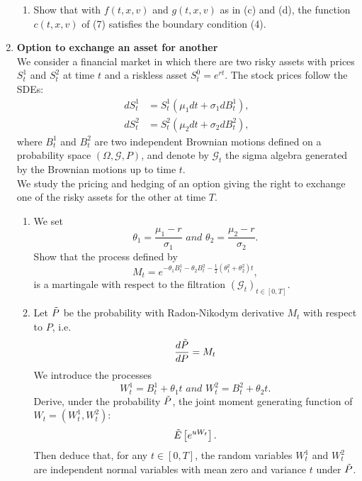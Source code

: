 \documentclass[11pt,a4,table]{article}
\begin{document}
\begin{enumerate}
\begin{enumerate}
        \item Show that with $f(t,x,v)$ and $g(t,x,v)$ as in (c) and (d), the function $c(t,x,v)$ of (7) satisfies the boundary condition (4).
    \end{enumerate}
    
    
    \item \textbf{Option to exchange an asset for another}\\
    We consider a financial market in which there are two risky assets with prices $S_t^1$ and $S_t^2$ at time $t$ and a riskless asset $S_t^0=e^{rt}$. The stock prices follow the SDEs:
    \begin{align*}
        dS_t^1 &= S_t^1(\mu_1 dt + \sigma_1 dB_t^1),\\
        dS_t^2 &= S_t^2(\mu_2 dt + \sigma_2 dB_t^2),
    \end{align*}
    where $B_t^1$ and $B_t^2$ are two independent Brownian motions defined on a probability space $(\Omega,\mathcal{G},P)$, and denote by $\mathcal{G}_t$ the sigma algebra generated by the Brownian motions up to time $t$.\\
    We study the pricing and hedging of an option giving the right to exchange one of the risky assets for the other at time $T$.
    
    \begin{enumerate}
        \item We set
        \begin{equation*}
            \theta_1=\frac{\mu_1 - r}{\sigma_1} \textit{ and } \theta_2=\frac{\mu_2 - r}{\sigma_2}.
        \end{equation*}
        Show that the process defined by
        \begin{equation*}
            M_t=e^{-\theta_1 B_t^1 -\theta_2 B_t^2 -\frac{1}{2}(\theta_1^2+\theta_2^2)t},
        \end{equation*}
        is a martingale with respect to the filtration $(\mathcal{G}_t)_{t\in[0, T]}$.
        
        \item Let $\Tilde{P}$ be the probability with Radon-Nikodym derivative $M_t$ with respect to $P$, i.e.
        \begin{equation*}
            \frac{d\Tilde{P}}{dP} = M_t
        \end{equation*}
        We introduce the processes
        \begin{equation*}
            W_t^1 = B_t^1 + \theta_1 t \textit{ and } W_t^2 = B_t^2 + \theta_2 t.
        \end{equation*}
        Derive, under the probability $\Tilde{P}$, the joint moment generating function of $W_t=(W_t^1, W_t^2)$:
        \begin{equation*}
            \Tilde{E}\left[e^{uW_t}\right].
        \end{equation*}
        Then deduce that, for any $t\in[0,T]$, the random variables $W_t^1$ and $W_t^2$ are independent normal variables with mean zero and variance $t$ under $\Tilde{P}$.
        

\end{enumerate}
\end{enumerate}
\end{document}
